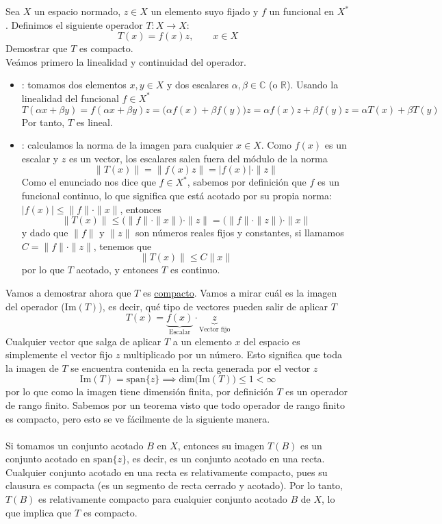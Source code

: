 \begin{ejercicio}
    Sea $X$ un espacio normado, $z \in X$ un elemento suyo fijado y $f$ un funcional en $X^*$. Definimos el siguiente operador $T: X \longrightarrow X$:
    \[ T(x) = f(x)z, \qquad x \in X \]
    Demostrar que $T$ es compacto. \\

    \noindent
    Veámos primero la linealidad y continuidad del operador.
    \begin{itemize}
        \item  {}: tomamos dos elementos $x, y \in X$ y dos escalares $\alpha, \beta \in \mathbb{C}$ (o $\mathbb{R}$). Usando la linealidad del funcional $f \in X^*$
        $$T(\alpha x + \beta y) = f(\alpha x + \beta y)z = \big(\alpha f(x) + \beta f(y)\big)z = \alpha f(x)z + \beta f(y)z = \alpha T(x) + \beta T(y)$$
        Por tanto, $T$ es lineal.
        \item {}: calculamos la norma de la imagen para cualquier $x \in X$. Como $f(x)$ es un escalar y $z$ es un vector, los escalares salen fuera del módulo de la norma
        $$\|T(x)\| = \|f(x)z\| = |f(x)| \cdot \|z\|$$
        Como el enunciado nos dice que $f \in X^*$, sabemos por definición que $f$ es un funcional continuo, lo que significa que está acotado por su propia norma: $|f(x)| \le \|f\| \cdot \|x\|$, entonces
        $$\|T(x)\| \le \big(\|f\| \cdot \|x\|\big) \cdot \|z\| = \big(\|f\| \cdot \|z\|\big) \cdot \|x\|$$
        y dado que $\|f\|$ y $\|z\|$ son números reales fijos y constantes, si llamamos $C = \|f\| \cdot \|z\|$, tenemos que 
        $$\|T(x)\| \le C \|x\|$$
        por lo que $T$ acotado, y entonces $T$ es continuo.
    \end{itemize}
    Vamos a demostrar ahora que $T$ es \underline{compacto}. Vamos a mirar cuál es la imagen del operador ($\text{Im}(T)$), es decir, qué tipo de vectores pueden salir de aplicar $T$
    $$T(x) = \underbrace{f(x)}_{\text{Escalar}} \cdot \underbrace{z}_{\text{Vector fijo}}$$
    Cualquier vector que salga de aplicar $T$ a un elemento $x$ del espacio es simplemente el vector fijo $z$ multiplicado por un número. Esto significa que toda la imagen de $T$ se encuentra contenida en la recta generada por el vector $z$
    $$\text{Im}(T) = \text{span}\{z\}\implies \text{dim}\big(\text{Im}(T)\big) \le 1 < \infty$$
    por lo que como la imagen tiene dimensión finita, por definición $T$ es un operador de rango finito. Sabemos por un teorema visto que todo operador de rango finito es compacto, pero esto se ve fácilmente de la siguiente manera. \\ \\
    \noindent
    Si tomamos un conjunto acotado $B$ en $X$, entonces su imagen $T(B)$ es un conjunto acotado en $\text{span}\{z\}$, es decir, es un conjunto acotado en una recta. Cualquier conjunto acotado en una recta es relativamente compacto, pues su clausura es compacta (es un segmento de recta cerrado y acotado). Por lo tanto, $T(B)$ es relativamente compacto para cualquier conjunto acotado $B$ de $X$, lo que implica que $T$ es compacto.

\end{ejercicio}
